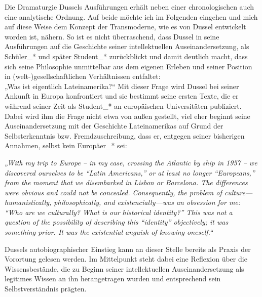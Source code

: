 \noindent Die Dramaturgie Dussels Ausführungen erhält neben einer chronologischen auch
eine analytische Ordnung. Auf beide möchte ich im Folgenden eingehen und mich
auf diese Weise dem Konzept der Transmoderne, wie es von Dussel entwickelt
worden ist, nähern. So ist es nicht überraschend, dass Dussel in seine
Ausführungen auf die Geschichte seiner intellektuellen Auseinandersetzung, als
Schüler\_* und später Student\_* zurückblickt und damit deutlich macht, dass sich
seine Philosophie unmittelbar aus dem eigenen Erleben und seiner Position in
(welt-)gesellschaftlichen Verhältnissen entfaltet:\footnotemark {}\\
„Was ist eigentlich Lateinamerika?“ Mit dieser Frage wird Dussel bei seiner
Ankunft in Europa konfrontiert und sie bestimmt seine ersten Texte, die er
während seiner Zeit als Student\_* an europäischen Universitäten publiziert.
Dabei wird ihm die Frage nicht etwa von außen gestellt, viel eher beginnt seine
Auseinandersetzung mit der Geschichte Lateinamerikas auf Grund der
Selbsterkenntnis bzw. Fremdzuschreibung, dass er, entgegen seiner bisherigen
Annahmen, selbst kein Europäer\_* sei:
\begin{myenv}
    \textit{ „With my trip to Europe – in my case, crossing the Atlantic by ship
    in 1957 – we discovered ourselves to be “Latin Americans,” or at least no
    longer “Europeans,” from the moment that we disembarked in Lisbon or
    Barcelona. The differences were obvious and could not be concealed.
    Consequently, the problem of culture—humanistically, philosophically, and
    existencially—was an obsession for me: “Who are we culturally? What is our
    historical identity?” This was not a question of the possibility of
    describing this “identity” objectively; it was something prior. It was the
    existential anguish of knowing oneself.“\footnotemark {}}
\end{myenv}
Dussels autobiographischer Einstieg kann an dieser Stelle bereits als Praxis der
Vorortung gelesen werden. Im Mittelpunkt steht dabei eine Reflexion über die
Wissensbestände, die zu Beginn seiner intellektuellen Auseinandersetzung als
legitimes Wissen an ihn herangetragen wurden und entsprechend sein
Selbstverständnis prägten. \\


